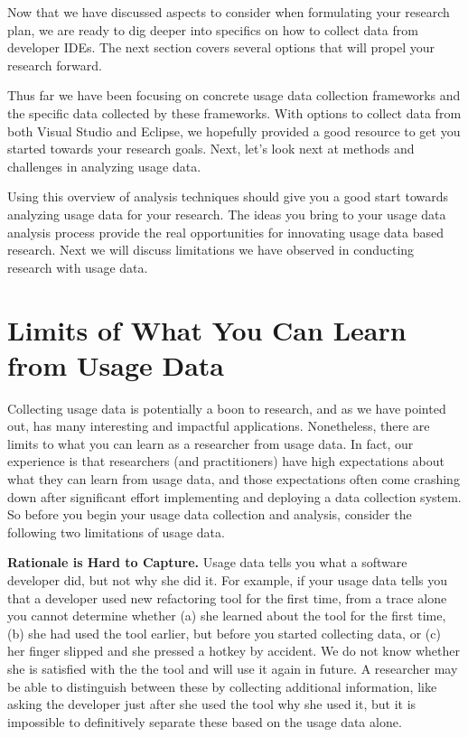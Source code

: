 \documentclass{book}
\begin{document}
\pagebreak






Now that we have discussed aspects to consider when formulating your research plan, we are ready to dig deeper into specifics on how to collect data from developer IDEs.  The next section covers several options that will propel your research forward.






Thus far we have been focusing on concrete usage data collection frameworks and the specific data collected by these frameworks.  With options to collect data from both Visual Studio and Eclipse, we hopefully provided a good resource to get you started towards your research goals.  Next, let's look next at methods and challenges in analyzing usage data.

\newpage




Using this overview of analysis techniques should give you a good start towards analyzing usage data for your research.
The ideas you bring to your usage data analysis process provide the real opportunities for innovating usage data based research.  Next we will discuss limitations we have observed in conducting research with usage data.

\section{Limits of What You Can Learn from Usage Data}
\label{sec:limitations}

Collecting usage data is potentially a boon to research, and as we have
pointed out, has many interesting and impactful applications.
Nonetheless, there are limits to what you can learn as a researcher
from usage data.
In fact, our experience is that researchers (and practitioners) have
high expectations about what they can learn from usage data, and those
expectations often come crashing down after significant effort implementing
and deploying a data collection system.
So before you begin your usage data collection and analysis, consider
the following two limitations of usage data.

\textbf{Rationale is Hard to Capture.}
Usage data tells you what a software developer did, but not
why she did it.
For example, if your usage data tells you that a developer used
new refactoring tool for the first time, from a trace alone you cannot determine whether
(a) she learned about the tool for the first time, (b) she had used the tool earlier, but before you started collecting data, or (c) her finger slipped and she pressed a hotkey by accident. We do not know whether she is satisfied with the the tool and will use it again in future.
A researcher may be able to distinguish between these by collecting additional information,
like asking the developer just after she used the tool why she used it,
but it is impossible to definitively separate these based on the
usage data alone.
\end{document}
